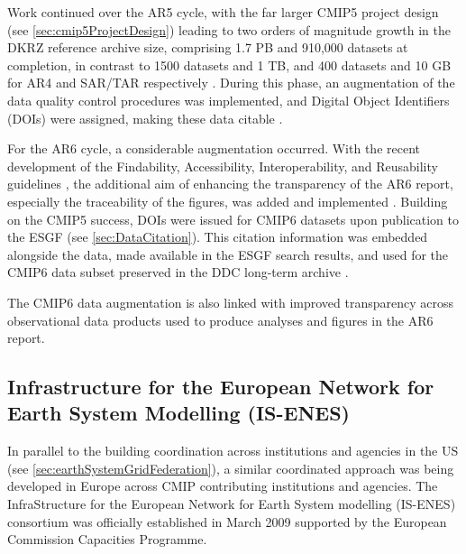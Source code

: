\documentclass[manuscript]{copernicus}
\newcommand{\mycomment}[1]{}
\begin{document}
Work continued over the AR5 cycle, with the far larger CMIP5 project design (see \autoref{sec:cmip5ProjectDesign}) leading to two orders of magnitude growth in the DKRZ reference archive size, comprising 1.7 PB and 910,000 datasets at completion, in contrast to 1500 datasets and 1 TB, and 400 datasets and 10 GB for AR4 and SAR/TAR respectively \citep{stockhause_twenty-five_2022}. During this phase, an augmentation of the data quality control procedures was implemented, and Digital Object Identifiers (DOIs) were assigned, making these data citable \citep{stockhause_quality_2012}.

For the AR6 cycle, a considerable augmentation occurred. With the recent development of the Findability, Accessibility, Interoperability, and Reusability guidelines \citep[FAIR;][]{wilkinson_fair_2016}, the additional aim of enhancing the transparency of the AR6 report, especially the traceability of the figures, was added and implemented \citep{stockhause_data_2019}. Building on the CMIP5 success, DOIs were issued for CMIP6 datasets upon publication to the ESGF (see \autoref{sec:DataCitation}). This citation information was embedded alongside the data, made available in the ESGF search results, and used for the CMIP6 data subset preserved in the DDC long-term archive \citep{stockhause_cmip6_2017}.

The CMIP6 data augmentation is also linked with improved transparency across observational data products used to produce analyses and figures in the AR6 report.

\mycomment{
Notes in https://gmd.copernicus.org/articles/15/6047/2022/, https://datascience.codata.org/articles/10.5334/dsj-2019-020, https://docs.google.com/document/d/1aQbZj6xQYr-5_Ub9tw9hucm6WzcPIImYMShONPYrpyo/edit?tab=t.0; Stockhause et al 2024, PLOS Climate might need to be added
https://web.archive.org/web/20051118060835/https://sedac.ciesin.columbia.edu/ddc/
https://sedac.ciesin.columbia.edu/ddc/
}


\subsection{Infrastructure for the European Network for Earth System Modelling (IS-ENES)}
\label{sec:IS-ENES}

In parallel to the building coordination across institutions and agencies in the US (see \autoref{sec:earthSystemGridFederation}), a similar coordinated approach was being developed in Europe across CMIP contributing institutions and agencies. The InfraStructure for the European Network for Earth System modelling (IS-ENES) consortium was officially established in March 2009 supported by the European Commission Capacities Programme.
\end{document}
